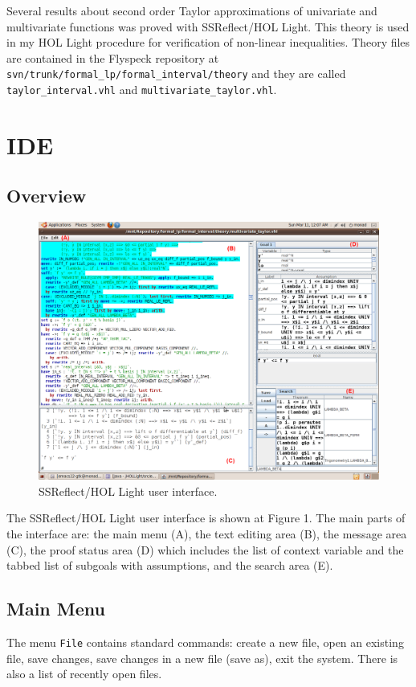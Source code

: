 \documentclass[a4paper]{article}
\begin{document}
Several results about second order Taylor approximations of univariate and multivariate functions was proved with SSReflect/HOL Light. This theory is used in my HOL Light procedure for verification of non-linear inequalities. Theory files are contained in the Flyspeck repository at {\tt svn/trunk/formal\_lp/formal\_interval/theory} and they are called {\tt taylor\_interval.vhl} and {\tt multivariate\_taylor.vhl}.


\section{IDE}

\subsection{Overview}
\begin{figure}
\label{gui}
\includegraphics[width=\textwidth]{Screenshot.png}
\caption{SSReflect/HOL Light user interface.}
\end{figure}

The SSReflect/HOL Light user interface is shown at Figure 1. The main parts of the interface are: the main menu (A), the text editing area (B), the message area (C), the proof status area (D) which includes the list of context variable and the tabbed list of subgoals with assumptions, and the search area (E).


\subsection{Main Menu}
The menu {\tt File} contains standard commands: create a new file, open an existing file, save changes, save changes in a new file (save as), exit the system. There is also a list of recently open files.
\end{document}

